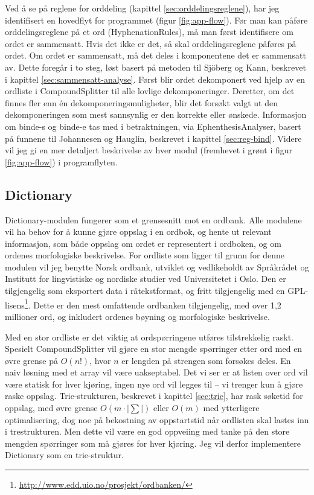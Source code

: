 Ved å se på reglene for orddeling (kapittel \ref{sec:orddelingsreglene}), har jeg identifisert en hovedflyt for programmet (figur \ref{fig:app-flow}). Før man kan påføre orddelingsreglene på et ord (HyphenationRules), må man først identifisere om ordet er sammensatt. Hvis det ikke er det, så skal orddelingsreglene påføres på ordet. Om ordet er sammensatt, må det deles i komponentene det er sammensatt av. Dette foregår i to steg, løst basert på metoden til Sjöberg og Kann, beskrevet i kapittel \ref{sec:sammensatt-analyse}. Først blir ordet dekomponert ved hjelp av en ordliste i CompoundSplitter til alle lovlige dekomponeringer. Deretter, om det finnes fler enn én dekomponeringsmuligheter, blir det forsøkt valgt ut den dekomponeringen som mest sannsynlig er den korrekte eller ønskede. Informasjon om binde-s og binde-e tas med i betraktningen, via EphenthesisAnalyser, basert på funnene til Johannesen og Hauglin, beskrevet i kapittel \ref{sec:reg-bind}. Videre vil jeg gi en mer detaljert beskrivelse av hver modul (fremhevet i grønt i figur \ref{fig:app-flow}) i programflyten.

\begin{SCfigure}[h]
\centering

\label{fig:app-flow}
\caption[Programflyt for Hyphenator]{Viser programflyten til Hyphenator. Moduler er fremhevet i grønt.}
\end{SCfigure}

\subsection{Dictionary}
\label{sec:dictionary}

Dictionary-modulen fungerer som et grensesnitt mot en ordbank. Alle modulene vil ha behov for å kunne gjøre oppslag i en ordbok, og hente ut relevant informasjon, som både oppslag om ordet er representert i ordboken, og om ordenes morfologiske beskrivelse. For ordliste som ligger til grunn for denne modulen vil jeg benytte Norsk ordbank, utviklet og vedlikeholdt av Språkrådet og Institutt for lingvistiske og nordiske studier ved Universitetet i Oslo. Den er tilgjengelig som eksportert data i råtekstformat, og fritt tilgjengelig med en GPL-lisens\footnote{\url{http://www.edd.uio.no/prosjekt/ordbanken/}}. Dette er den mest omfattende ordbanken tilgjengelig, med over 1,2 millioner ord, og inkludert ordenes bøyning og morfologiske beskrivelse.

Med en stor ordliste er det viktig at ordspørringene utføres tilstrekkelig raskt. Spesielt CompoundSplitter vil gjøre en stor mengde spørringer etter ord med en øvre grense på $O(n!)$, hvor $n$ er lengden på strengen som forsøkes deles. En naiv løsning med et array vil være uakseptabel. Det vi ser er at listen over ord vil være statisk for hver kjøring, ingen nye ord vil legges til – vi trenger kun å gjøre raske oppslag. Trie-strukturen, beskrevet i kapittel \ref{sec:trie}, har rask søketid for oppslag, med øvre grense $O(m\cdot |\sum|)$ eller $O(m)$ med ytterligere optimalisering, dog noe på bekostning av oppstartstid når ordlisten skal lastes inn i trestrukturen. Men dette vil være en god oppveiing med tanke på den store mengden spørringer som må gjøres for hver kjøring. Jeg vil derfor implementere Dictionary som en trie-struktur.

